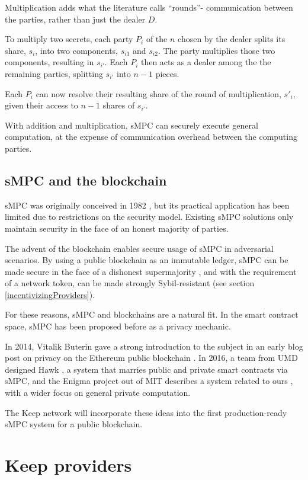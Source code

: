 \documentclass[11pt]{article}
\begin{document}
Multiplication adds what the literature calls ``rounds''- communication
between the parties, rather than just the dealer $D$.

To multiply two secrets, each party $P_i$ of the $n$ chosen by the
dealer splits its share, $s_i$, into two components, $s_{i1}$ and
$s_{i2}$. The party multiplies those two components, resulting in
$s_{i'}$. Each $P_i$ then acts as a dealer among the the remaining
parties, splitting $s_{i'}$ into $n-1$ pieces.

Each $P_i$ can now resolve their resulting share of the round of
multiplication, $s'_i$, given their access to $n-1$ shares of
$s_{i'}$.

With addition and multiplication, sMPC can securely execute general
computation, at the expense of communication overhead between the
computing parties.

\subsection{sMPC and the blockchain}

sMPC was originally conceived in 1982 \cite{yao1982protocols}, but its
practical application has been limited due to restrictions on the
security model. Existing sMPC solutions only maintain security in the
face of an honest majority of parties.

The advent of the blockchain enables secure usage of sMPC in
adversarial scenarios. By using a public blockchain as an immutable
ledger, sMPC can be made secure in the face of a dishonest
supermajority \cite{spdz}, and with the requirement of a network
token, can be made strongly Sybil-resistant
(see section \ref{incentivizingProviders}).

For these reasons, sMPC and blockchains are a natural fit. In the
smart contract space, sMPC has been proposed before as a privacy
mechanic.

In 2014, Vitalik Buterin gave a strong introduction to the subject in
an early blog post on privacy on the Ethereum public blockchain
\cite{secretSharingDaos}. In 2016, a team from UMD designed Hawk
\cite{hawk}, a system that marries public and private smart contracts
via sMPC, and the Enigma project out of MIT describes a system related
to ours \cite{enigma}, with a wider focus on general private
computation.

The Keep network will incorporate these ideas into the first
production-ready sMPC system for a public blockchain.

\section{Keep providers} \label{keepProviders}
\end{document}
